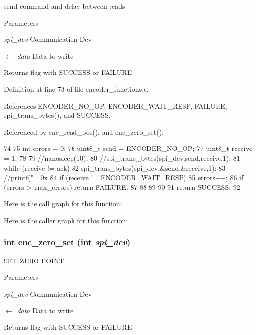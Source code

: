 send command and delay between reads 


\begin{DoxyParams}{Parameters}
\item[{\em spi\_\-dev}]Communication Dev \item[\mbox{$\leftarrow$} {\em data}]Data to write \end{DoxyParams}
\begin{DoxyReturn}{Returns}
flag with SUCCESS or FAILURE 
\end{DoxyReturn}


Definition at line 73 of file encoder\_\-functions.c.



References ENCODER\_\-NO\_\-OP, ENCODER\_\-WAIT\_\-RESP, FAILURE, spi\_\-trans\_\-bytes(), and SUCCESS.



Referenced by enc\_\-read\_\-pos(), and enc\_\-zero\_\-set().




\begin{DoxyCode}
74 {
75     int errors = 0;
76     uint8_t send = ENCODER_NO_OP;
77     uint8_t receive = 1;
78         
79   //nanosleep(10);
80         //spi_trans_bytes(spi_dev,send,receive,1);
81     while (receive != ack) {
82         spi_trans_bytes(spi_dev,&send,&receive,1);
83         //printf("\nReceive = 0x%
84         if (receive != ENCODER_WAIT_RESP) {
85             errors++;
86             if (errors > max_errors) { return FAILURE; }
87         }
88     }
89 
90 
91     return SUCCESS;
92 }
\end{DoxyCode}




Here is the call graph for this function:



Here is the caller graph for this function:

\hypertarget{group__enc_gaebbe7b9d3c2571f7481cefacbe36c498}{
\subsubsection[{enc\_\-zero\_\-set}]{\setlength{\rightskip}{0pt plus 5cm}int enc\_\-zero\_\-set (int {\em spi\_\-dev})}}
\label{group__enc_gaebbe7b9d3c2571f7481cefacbe36c498}


SET ZERO POINT. 


\begin{DoxyParams}{Parameters}
\item[{\em spi\_\-dev}]Communication Dev \item[\mbox{$\leftarrow$} {\em data}]Data to write\end{DoxyParams}
\begin{DoxyReturn}{Returns}
flag with SUCCESS or FAILURE 
\end{DoxyReturn}


